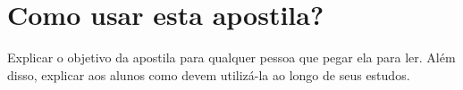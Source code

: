 \chapter*{Como usar esta apostila?}
   Explicar o objetivo da apostila para qualquer pessoa que pegar ela para ler. Além disso, explicar aos alunos como devem utilizá-la ao longo de seus estudos.
